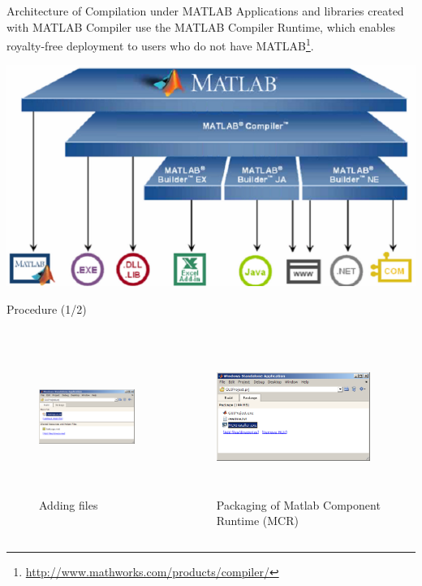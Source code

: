 \documentclass[10pt, english, notes]{beamer}
\begin{document}
\begin{frame}{Architecture of Compilation under MATLAB}
Applications and libraries created with MATLAB Compiler use the MATLAB Compiler Runtime, which enables royalty-free deployment to users who do not have MATLAB\footnote{\url{http://www.mathworks.com/products/compiler/}}.
\begin{center}
\includegraphics[scale = 0.4, angle = 0]{GUI/DeployPic}
\end{center}
\end{frame}
\begin{frame}{Procedure (1/2)}
\begin{columns}
\begin{column}{5cm}
\begin{figure}
\centering
\includegraphics[height = 5cm, width = 5cm]{GUI/DeployPro}
\caption{Adding files}
\end{figure}
\end{column}
\begin{column}{5cm}
\begin{figure}
\centering
\includegraphics[height = 5cm, width = 5cm]{GUI/DeployProConf}
\caption{Packaging of Matlab Component Runtime (MCR)}
\end{figure}
\end{column}
\end{columns}
\end{frame}
\end{document}
